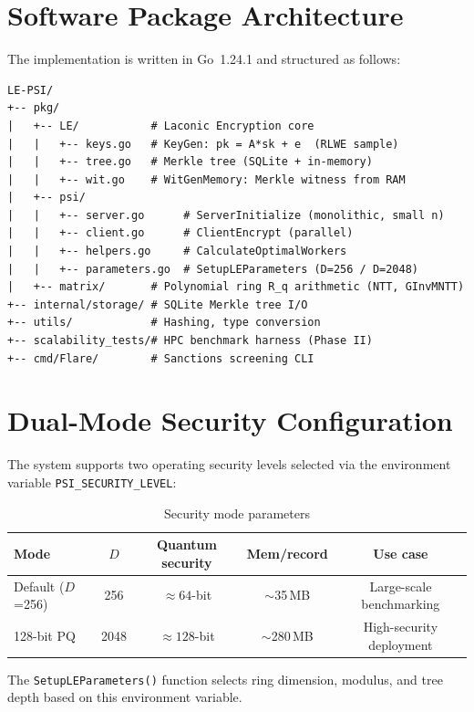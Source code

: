 \section{Software Package Architecture}

The implementation is written in Go~1.24.1 and structured as follows:

\begin{verbatim}
LE-PSI/
+-- pkg/
|   +-- LE/           # Laconic Encryption core
|   |   +-- keys.go   # KeyGen: pk = A*sk + e  (RLWE sample)
|   |   +-- tree.go   # Merkle tree (SQLite + in-memory)
|   |   +-- wit.go    # WitGenMemory: Merkle witness from RAM
|   +-- psi/
|   |   +-- server.go      # ServerInitialize (monolithic, small n)
|   |   +-- client.go      # ClientEncrypt (parallel)
|   |   +-- helpers.go     # CalculateOptimalWorkers
|   |   +-- parameters.go  # SetupLEParameters (D=256 / D=2048)
|   +-- matrix/       # Polynomial ring R_q arithmetic (NTT, GInvMNTT)
+-- internal/storage/ # SQLite Merkle tree I/O
+-- utils/            # Hashing, type conversion
+-- scalability_tests/# HPC benchmark harness (Phase II)
+-- cmd/Flare/        # Sanctions screening CLI
\end{verbatim}


\section{Dual-Mode Security Configuration}

The system supports two operating security levels selected via the environment variable
\texttt{PSI\_SECURITY\_LEVEL}:

\begin{table}[H]
\centering
\caption{Security mode parameters}
\label{tab:modes}
\begin{tabular}{@{}lcccc@{}}
\toprule
\textbf{Mode} & \textbf{$D$} & \textbf{Quantum security} & \textbf{Mem/record} & \textbf{Use case} \\
\midrule
Default ($D$=256)  & 256  & $\approx 64$-bit  & $\sim$35\,MB  & Large-scale benchmarking \\
128-bit PQ         & 2048 & $\approx 128$-bit & $\sim$280\,MB & High-security deployment \\
\bottomrule
\end{tabular}
\end{table}

The \texttt{SetupLEParameters()} function selects ring dimension, modulus, and tree
depth based on this environment variable.

